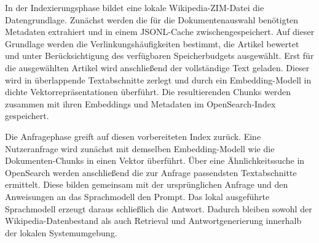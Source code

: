 In der Indexierungsphase bildet eine lokale Wikipedia-ZIM-Datei die
Datengrundlage. Zunächst werden die für die Dokumentenauswahl benötigten
Metadaten extrahiert und in einem JSONL-Cache zwischengespeichert. Auf dieser
Grundlage werden die Verlinkungshäufigkeiten bestimmt, die Artikel bewertet und unter
Berücksichtigung des verfügbaren Speicherbudgets ausgewählt. Erst für die
ausgewählten Artikel wird anschließend der vollständige Text geladen. Dieser
wird in überlappende Textabschnitte zerlegt und durch ein Embedding-Modell in
dichte Vektorrepräsentationen überführt. Die resultierenden Chunks werden
zusammen mit ihren Embeddings und Metadaten im OpenSearch-Index gespeichert.

Die Anfragephase greift auf diesen vorbereiteten Index zurück. Eine
Nutzeranfrage wird zunächst mit demselben Embedding-Modell wie die
Dokumenten-Chunks in einen Vektor überführt. Über eine Ähnlichkeitssuche in
OpenSearch werden anschließend die zur Anfrage passendsten Textabschnitte
ermittelt. Diese bilden gemeinsam mit der ursprünglichen Anfrage und den
Anweisungen an das Sprachmodell den Prompt. Das lokal ausgeführte Sprachmodell
erzeugt daraus schließlich die Antwort. Dadurch bleiben sowohl der
Wikipedia-Datenbestand als auch Retrieval und Antwortgenerierung innerhalb der
lokalen Systemumgebung.

